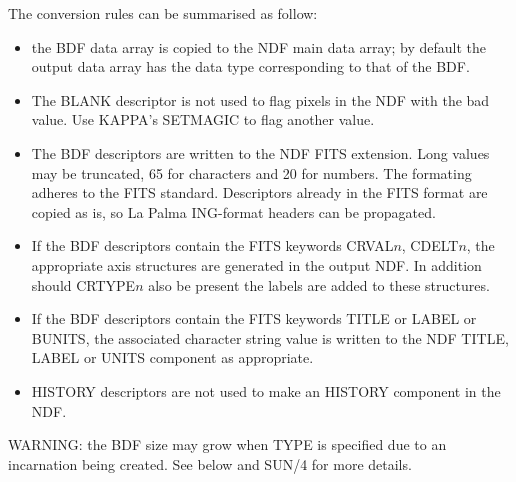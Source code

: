 {{{         \sstitem
         The conversion rules can be summarised as follow:
         \begin{itemize}
            \item the BDF data array is copied to the NDF main data array;
            by default the output data array has the data type
            corresponding to that of the BDF.
            \item The BLANK descriptor is not used to flag pixels in the NDF
            with the bad value.  Use KAPPA's SETMAGIC to flag another
            value.
            \item The BDF descriptors are written to the NDF FITS extension.
            Long values may be truncated, 65 for characters and 20 for
            numbers.  The formating adheres to the FITS standard.
            Descriptors already in the FITS format are copied as is, so
            La Palma ING-format headers can be propagated.
            \item If the BDF descriptors contain the FITS keywords CRVAL$n$,
            CDELT$n$, the appropriate axis structures are generated in
            the output NDF. In addition should CRTYPE$n$ also be present
            the labels are added to these structures.
            \item If the BDF descriptors contain the FITS keywords TITLE or
            LABEL or BUNITS, the associated character string value is
            written to the NDF TITLE, LABEL or UNITS component as
            appropriate.
            \item HISTORY descriptors are not used to make an HISTORY
            component in the NDF.
         \end{itemize}

         \sstitem
         WARNING: the BDF size may grow when TYPE is specified due to
         an incarnation being created.  See below and SUN/4 for more
         details.
      }
   }
   }

